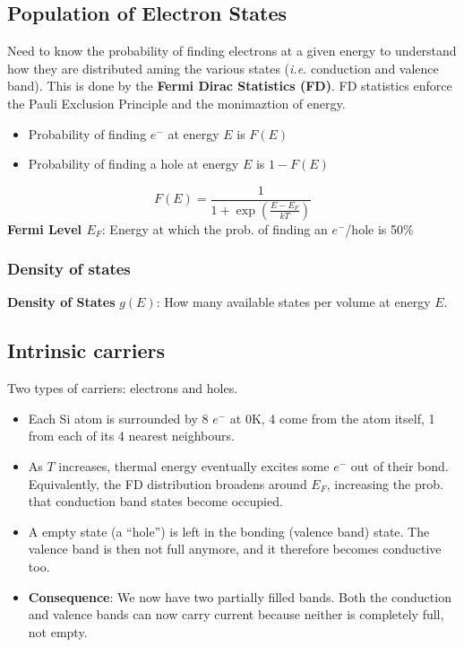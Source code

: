 \documentclass[a4paper, fontsize=8pt, landscape, DIV=1]{scrartcl}
\begin{document}
\begin{multicols*}{4}
  \subsection{Population of Electron States}
  Need to know the probability of finding electrons at a given energy to understand how they are distributed aming the various states (\textit{i.e.} conduction and valence band). This is done by the \textbf{Fermi Dirac Statistics (FD)}. FD statistics enforce the Pauli Exclusion Principle and the monimaztion of energy.

  \begin{itemize}
    \item Probability of finding $e^-$ at energy $E$ is $F(E)$
    \item Probability of finding a hole at energy $E$ is $1-F(E)$
  \end{itemize}

  \[F(E) = \frac{1}{1+\exp\left(\frac{E-E_F}{kT}\right)}\]
  \textbf{Fermi Level $E_F$}: Energy at which the prob. of finding an $e^-$/hole is 50\%

  \subsubsection{Density of states}
  \textbf{Density of States} $g(E)$: How many available states per volume at energy $E$.
  
  \subsection{Intrinsic carriers}
  Two types of carriers: electrons and holes.
  \begin{itemize}
    \item Each Si atom is surrounded by 8 $e^-$ at 0K, 4 come from the atom itself, 1 from each of its 4 nearest neighbours.
    \item As $T$ increases, thermal energy eventually excites some $e^-$ out of their bond. Equivalently, the FD distribution broadens around $E_F$, increasing the prob. that conduction band states become occupied.
    \item A empty state (a ``hole'') is left in the bonding (valence band) state. The valence band is then not full anymore, and it therefore becomes conductive too.
    \item \textbf{Consequence}: We now have two partially filled bands. Both the conduction and valence bands can now carry current because neither is completely full, not empty.
  \end{itemize}


\end{multicols*}
\end{document}
